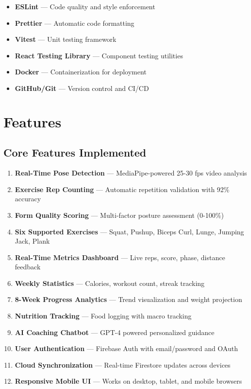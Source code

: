 \documentclass[12pt,a4paper]{article}
\begin{document}
\begin{itemize}[noitemsep, topsep=2pt]
  \item \textbf{ESLint} --- Code quality and style enforcement
  \item \textbf{Prettier} --- Automatic code formatting
  \item \textbf{Vitest} --- Unit testing framework
  \item \textbf{React Testing Library} --- Component testing utilities
  \item \textbf{Docker} --- Containerization for deployment
  \item \textbf{GitHub/Git} --- Version control and CI/CD
\end{itemize}

\section{Features}

\subsection{Core Features Implemented}

\begin{enumerate}[noitemsep, topsep=2pt]
  \item \textbf{Real-Time Pose Detection} --- MediaPipe-powered 25-30 fps video analysis
  \item \textbf{Exercise Rep Counting} --- Automatic repetition validation with 92\% accuracy
  \item \textbf{Form Quality Scoring} --- Multi-factor posture assessment (0-100\%)
  \item \textbf{Six Supported Exercises} --- Squat, Pushup, Biceps Curl, Lunge, Jumping Jack, Plank
  \item \textbf{Real-Time Metrics Dashboard} --- Live reps, score, phase, distance feedback
  \item \textbf{Weekly Statistics} --- Calories, workout count, streak tracking
  \item \textbf{8-Week Progress Analytics} --- Trend visualization and weight projection
  \item \textbf{Nutrition Tracking} --- Food logging with macro tracking
  \item \textbf{AI Coaching Chatbot} --- GPT-4 powered personalized guidance
  \item \textbf{User Authentication} --- Firebase Auth with email/password and OAuth
  \item \textbf{Cloud Synchronization} --- Real-time Firestore updates across devices
  \item \textbf{Responsive Mobile UI} --- Works on desktop, tablet, and mobile browsers
\end{enumerate}
\end{document}
